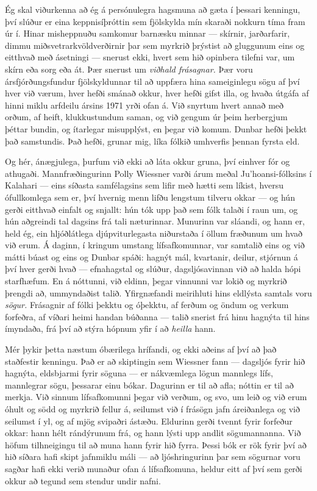 Ég skal viðurkenna að ég á persónulegra hagsmuna að gæta í þessari kenningu, því slúður er eina keppnisíþróttin sem fjölskylda mín skaraði nokkurn tíma fram úr í. Hinar misheppnuðu samkomur barnæsku minnar — skírnir, jarðarfarir, dimmu miðsvetrarkvöldverðirnir þar sem myrkrið þrýstist að gluggunum eins og eitthvað með ásetningi — snerust ekki, hvert sem hið opinbera tilefni var, um skírn eða sorg eða át. Þær snerust um \emph{viðhald frásagnar.} Þær voru ársfjórðungsfundur fjölskyldunnar til að uppfæra hina sameiginlegu sögu af því hver við værum, hver hefði smánað okkur, hver hefði gifst illa, og hvaða útgáfa af hinni miklu arfdeilu ársins 1971 yrði ofan á. Við snyrtum hvert annað með orðum, af heift, klukkustundum saman, og við gengum úr þeim herbergjum þéttar bundin, og ítarlegar misupplýst, en þegar við komum. Dunbar hefði þekkt það samstundis. Það hefði, grunar mig, líka fólkið umhverfis þennan fyrsta eld.

Og hér, ánægjulega, þurfum við ekki að láta okkur gruna, því einhver fór og athugaði. Mannfræðingurinn Polly Wiessner varði árum meðal Ju'hoansi-fólksins í Kalahari — eins síðasta samfélagsins sem lifir með hætti sem líkist, hversu ófullkomlega sem er, því hvernig menn lifðu lengstum tilveru okkar — og hún gerði eitthvað einfalt og snjallt: hún tók upp það sem fólk talaði í raun um, og hún aðgreindi tal dagsins frá tali næturinnar. Munurinn var sláandi, og hann er, held ég, ein hljóðlátlega djúpviturlegasta niðurstaða í öllum fræðunum um hvað við erum. Á daginn, í kringum umstang lífsafkomunnar, var samtalið eins og við mátti búast og eins og Dunbar spáði: hagnýt mál, kvartanir, deilur, stjórnun á því hver gerði hvað — efnahagstal og slúður, dagsljósavinnan við að halda hópi starfhæfum. En á nóttunni, við eldinn, þegar vinnunni var lokið og myrkrið þrengdi að, ummyndaðist talið. Yfirgnæfandi meirihluti hins eldlýsta samtals voru \emph{sögur.} Frásagnir af fólki þekktu og óþekktu, af ferðum og öndum og verkum forfeðra, af víðari heimi handan búðanna — talið snerist frá hinu hagnýta til hins ímyndaða, frá því að stýra hópnum yfir í að \emph{heilla} hann.

Mér þykir þetta næstum óbærilega hrífandi, og ekki aðeins af því að það staðfestir kenningu. Það er að skiptingin sem Wiessner fann — dagsljós fyrir hið hagnýta, eldsbjarmi fyrir söguna — er nákvæmlega lögun mannlegs lífs, mannlegrar sögu, þessarar einu bókar. Dagurinn er til að afla; nóttin er til að merkja. Við sinnum lífsafkomunni þegar við verðum, og svo, um leið og við erum óhult og södd og myrkrið fellur á, seilumst við í frásögn jafn áreiðanlega og við seilumst í yl, og af mjög svipaðri ástæðu. Eldurinn gerði tvennt fyrir forfeður okkar: hann hélt rándýrunum frá, og hann lýsti upp andlit sögumannanna. Við höfum tilhneigingu til að muna hann fyrir hið fyrra. Þessi bók er rök fyrir því að hið síðara hafi skipt jafnmiklu máli — að ljóshringurinn þar sem sögurnar voru sagðar hafi ekki verið munaður ofan á lífsafkomuna, heldur eitt af því sem gerði okkur að tegund sem stendur undir nafni.

